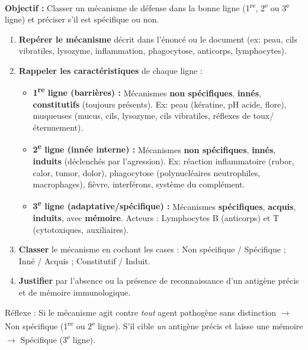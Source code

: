 \documentclass[11pt]{article}
\newcommand{\cle}[1]{{\popxbold\color{popdark}#1}}
\begin{document}
\begin{methode}
\textbf{Objectif :} Classer un mécanisme de défense dans la bonne ligne (1\textsuperscript{re}, 2\textsuperscript{e} ou 3\textsuperscript{e} ligne) et préciser s'il est spécifique ou non.
\begin{enumerate}
 \item \textbf{Repérer le mécanisme} décrit dans l'énoncé ou le document (ex: peau, cils vibratiles, lysozyme, inflammation, phagocytose, anticorps, lymphocytes).
 \item \textbf{Rappeler les caractéristiques} de chaque ligne :
 \begin{itemize}
 \item \textbf{1\textsuperscript{re} ligne (barrières) :} Mécanismes \textbf{non spécifiques}, \textbf{innés}, \textbf{constitutifs} (toujours présents). Ex: peau (kératine, pH acide, flore), muqueuses (mucus, cils, lysozyme, cils vibratiles, réflexes de toux/éternuement).
 \item \textbf{2\textsuperscript{e} ligne (innée interne) :} Mécanismes \textbf{non spécifiques}, \textbf{innés}, \textbf{induits} (déclenchés par l'agression). Ex: réaction inflammatoire (rubor, calor, tumor, dolor), phagocytose (polynucléaires neutrophiles, macrophages), fièvre, interférons, système du complément.
 \item \textbf{3\textsuperscript{e} ligne (adaptative/spécifique) :} Mécanismes \textbf{spécifiques}, \textbf{acquis}, \textbf{induits}, avec \textbf{mémoire}. Acteurs : Lymphocytes B (anticorps) et T (cytotoxiques, auxiliaires).
 \end{itemize}
 \item \textbf{Classer} le mécanisme en cochant les cases : Non spécifique / Spécifique ; Inné / Acquis ; Constitutif / Induit.
 \item \textbf{Justifier} par l'absence ou la présence de reconnaissance d'un antigène précis et de mémoire immunologique.
\end{enumerate}
\cle{Réflexe :} Si le mécanisme agit contre \emph{tout} agent pathogène sans distinction $\rightarrow$ Non spécifique (1\textsuperscript{re} ou 2\textsuperscript{e} ligne). S'il cible \emph{un} antigène précis et laisse une mémoire $\rightarrow$ Spécifique (3\textsuperscript{e} ligne).
\end{methode}
\end{document}
